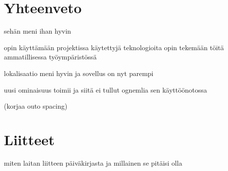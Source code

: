 \documentclass[11pt,a4paper,titlepage,oneside]{article}
\begin{document}










\newpage
{} %










\newpage
\section{Yhteenveto}             %

sehän meni ihan hyvin 

opin käyttämään projektissa käytettyjä teknologioita
opin tekemään töitä ammatillisessa työympäristössä
\medskip


lokalisaatio meni hyvin ja sovellus on nyt parempi
\medskip


uusi ominaisuus toimii ja siitä ei tullut ognemlia sen käyttöönotossa
\medskip





\newpage




(korjaa outo spacing)








\section{Liitteet}               %

miten laitan liitteen päiväkirjasta ja millainen se pitäisi olla
\end{document}
